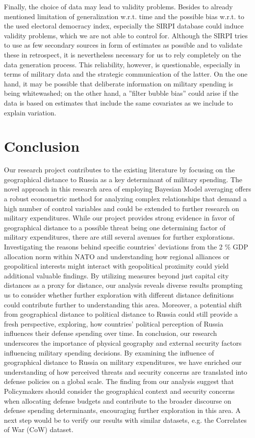 \documentclass[12pt,a4paper]{article}
\begin{document}
Finally, the choice of data may lead to validity problems. Besides to already mentioned limitation of generalization w.r.t. time and the possible bias w.r.t. to the used electoral democracy index, especially the SIRPI database could induce validity problems, which we are not able to control for. Although the SIRPI tries to use as few secondary sources in form of estimates as possible and to validate these in retrospect, it is nevertheless necessary for us to rely completely on the data generation process. This reliability, however, is questionable, especially in terms of military data and the strategic communication of the latter. On the one hand, it may be possible that deliberate information on military spending is being whitewashed; on the other hand, a ''filter bubble bias'' could arise if the data is based on estimates that include the same covariates as we include to explain variation. 
\section{Conclusion}

Our research project contributes to the existing literature by focusing on the geographical distance to Russia as a key determinant of military spending. The novel approach in this research area of employing Bayesian Model averaging offers a robust econometric method for analyzing complex relationships that demand a high number of control variables and could be extended to further research on military expenditures. 
While our project provides strong evidence in favor of geographical distance to a possible threat being one determining factor of military expenditures, there are still several avenues for further explorations. Investigating the reasons behind specific countries’ deviations from the 2 \% GDP allocation norm within NATO and understanding how regional alliances or geopolitical interests might interact with geopolitical proximity could yield additional valuable findings. 
By utilizing measures beyond just capital city distances as a proxy for distance, our analysis reveals diverse results prompting us to consider whether further exploration with different distance definitions could contribute further to understanding this area. Moreover, a potential shift from geographical distance to political distance to Russia could still provide a fresh perspective, exploring, how countries’ political perception of Russia influences their defense spending over time.
In conclusion, our research underscores the importance of physical geography and external security factors influencing military spending decisions. By examining the influence of geographical distance to Russia on military expenditures, we have enriched our understanding of how perceived threats and security concerns are translated into defense policies on a global scale. The finding from our analysis suggest that Policymakers should consider the geographical context and security concerns when allocating defense budgets and contribute to the broader discourse on defense spending determinants, encouraging further exploration in this area. A next step would be to verify our results with similar datasets, e.g. the Correlates of War (CoW) dataset. 
\end{document}
